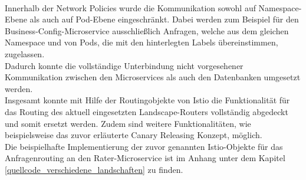 \\
Innerhalb der Network Policies wurde die Kommunikation sowohl auf Namespace-Ebene als auch auf Pod-Ebene eingeschränkt. Dabei werden zum Beispiel für den Business-Config-Microservice ausschließlich Anfragen, welche aus dem gleichen Namespace und von Pods, die mit den hinterlegten Labels übereinstimmen, zugelassen.\\
Dadurch konnte die vollständige Unterbindung nicht vorgesehener Kommunikation zwischen den Microservices als auch den Datenbanken umgesetzt werden.
\\
Insgesamt konnte mit Hilfe der Routingobjekte von Istio die Funktionalität für das Routing des aktuell eingesetzten Landscape-Routers vollständig abgedeckt und somit ersetzt werden. Zudem sind weitere Funktionalitäten, wie beispielsweise das zuvor erläuterte Canary Releasing Konzept, möglich.\\
Die beispielhafte Implementierung der zuvor genannten Istio-Objekte für das Anfragenrouting an den Rater-Microservice ist im Anhang unter dem Kapitel \ref{quellcode_verschiedene_landschaften} zu finden.

